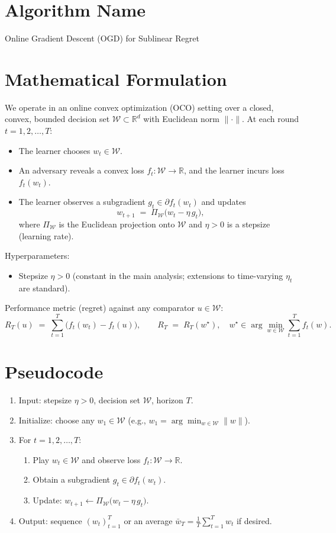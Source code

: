 \documentclass[12pt]{article}
\newcommand{\R}{\mathbb{R}}
\begin{document}
\section*{Algorithm Name}
Online Gradient Descent (OGD) for Sublinear Regret

\section*{Mathematical Formulation}
We operate in an online convex optimization (OCO) setting over a closed, convex, bounded decision set $\mathcal{W}\subset \R^d$ with Euclidean norm $\|\cdot\|$. At each round $t=1,2,\dots,T$:
\begin{itemize}[leftmargin=2em]
\item The learner chooses $w_t\in \mathcal{W}$.
\item An adversary reveals a convex loss $f_t:\mathcal{W}\to \R$, and the learner incurs loss $f_t(w_t)$.
\item The learner observes a subgradient $g_t\in \partial f_t(w_t)$ and updates
\[
w_{t+1} \;=\; \Pi_{\mathcal{W}}\!\bigl(w_t - \eta\, g_t\bigr),
\]
where $\Pi_{\mathcal{W}}$ is the Euclidean projection onto $\mathcal{W}$ and $\eta>0$ is a stepsize (learning rate).
\end{itemize}
Hyperparameters:
\begin{itemize}[leftmargin=2em]
\item Stepsize $\eta>0$ (constant in the main analysis; extensions to time-varying $\eta_t$ are standard).
\end{itemize}
Performance metric (regret) against any comparator $u\in \mathcal{W}$:
\[
R_T(u) \;=\; \sum_{t=1}^T \bigl(f_t(w_t) - f_t(u)\bigr), 
\qquad 
R_T \;=\; R_T(w^\star), 
\quad w^\star \in \arg\min_{w\in \mathcal{W}} \sum_{t=1}^T f_t(w).
\]

\section*{Pseudocode}
\begin{enumerate}[leftmargin=2em]
\item Input: stepsize $\eta>0$, decision set $\mathcal{W}$, horizon $T$.
\item Initialize: choose any $w_1\in \mathcal{W}$ (e.g., $w_1=\arg\min_{w\in \mathcal{W}}\|w\|$).
\item For $t=1,2,\dots,T$:
\begin{enumerate}
\item Play $w_t\in \mathcal{W}$ and observe loss $f_t:\mathcal{W}\to\R$.
\item Obtain a subgradient $g_t\in \partial f_t(w_t)$.
\item Update: $w_{t+1} \leftarrow \Pi_{\mathcal{W}}\!\bigl(w_t - \eta\, g_t\bigr)$.
\end{enumerate}
\item Output: sequence $(w_t)_{t=1}^T$ or an average $\bar{w}_T = \frac{1}{T}\sum_{t=1}^T w_t$ if desired.
\end{enumerate}
\end{document}
